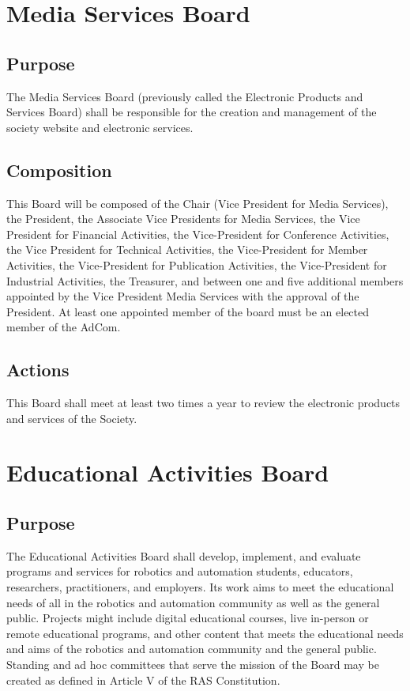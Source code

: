\documentclass[10pt]{article}
\begin{document}
\section{Media Services Board}
\label{MSB}

\subsection{Purpose}

The Media Services Board (previously called the Electronic Products and Services Board) shall be responsible for the creation and management of the society website and electronic services.

\subsection{Composition}

This Board will be composed of the Chair (Vice President for Media Services), the President, the Associate Vice Presidents for Media Services, the Vice President for Financial Activities, the Vice-President for Conference Activities,  the Vice President for Technical Activities, the Vice-President for Member Activities, the Vice-President for Publication Activities, the Vice-President for Industrial Activities, the Treasurer, and between one and five additional members appointed by the Vice President Media Services with the approval of the President. At least one appointed member of the board must be an elected member of the AdCom.  

\subsection{Actions}

This Board shall meet at least two times a year to review the electronic products and services of the Society.


\section{Educational Activities Board}
\label{EAB}

\subsection{Purpose}
The Educational Activities Board shall develop, implement, and evaluate programs and services for robotics and automation students, educators, researchers, practitioners, and employers. Its work aims to meet the educational needs of all in the robotics and automation community as well as the general public. Projects might include digital educational courses, live in-person or remote educational programs, and other content that meets the educational needs and aims of the robotics and automation community and the general public. Standing and ad hoc committees that serve the mission of the Board may be created as defined in Article V of the RAS Constitution. 
\end{document}
